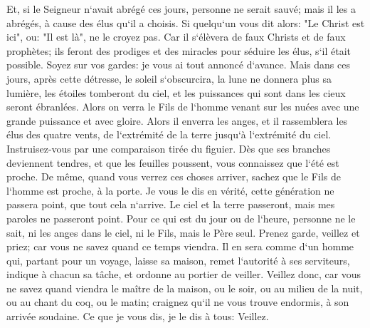 \verse Et, si le Seigneur n`avait abrégé ces jours, personne ne serait sauvé; mais il les a abrégés, à cause des élus qu`il a choisis. 
\verse Si quelqu`un vous dit alors: "Le Christ est ici", ou: "Il est là", ne le croyez pas. 
\verse Car il s`élèvera de faux Christs et de faux prophètes; ils feront des prodiges et des miracles pour séduire les élus, s`il était possible. 
\verse Soyez sur vos gardes: je vous ai tout annoncé d`avance. 
\verse Mais dans ces jours, après cette détresse, le soleil s`obscurcira, la lune ne donnera plus sa lumière, 
\verse les étoiles tomberont du ciel, et les puissances qui sont dans les cieux seront ébranlées. 
\verse Alors on verra le Fils de l`homme venant sur les nuées avec une grande puissance et avec gloire. 
\verse Alors il enverra les anges, et il rassemblera les élus des quatre vents, de l`extrémité de la terre jusqu`à l`extrémité du ciel. 
\verse Instruisez-vous par une comparaison tirée du figuier. Dès que ses branches deviennent tendres, et que les feuilles poussent, vous connaissez que l`été est proche. 
\verse De même, quand vous verrez ces choses arriver, sachez que le Fils de l`homme est proche, à la porte. 
\verse Je vous le dis en vérité, cette génération ne passera point, que tout cela n`arrive. 
\verse Le ciel et la terre passeront, mais mes paroles ne passeront point. 
\verse Pour ce qui est du jour ou de l`heure, personne ne le sait, ni les anges dans le ciel, ni le Fils, mais le Père seul. 
\verse Prenez garde, veillez et priez; car vous ne savez quand ce temps viendra. 
\verse Il en sera comme d`un homme qui, partant pour un voyage, laisse sa maison, remet l`autorité à ses serviteurs, indique à chacun sa tâche, et ordonne au portier de veiller. 
\verse Veillez donc, car vous ne savez quand viendra le maître de la maison, ou le soir, ou au milieu de la nuit, ou au chant du coq, ou le matin; 
\verse craignez qu`il ne vous trouve endormis, à son arrivée soudaine. 
\verse Ce que je vous dis, je le dis à tous: Veillez. 

